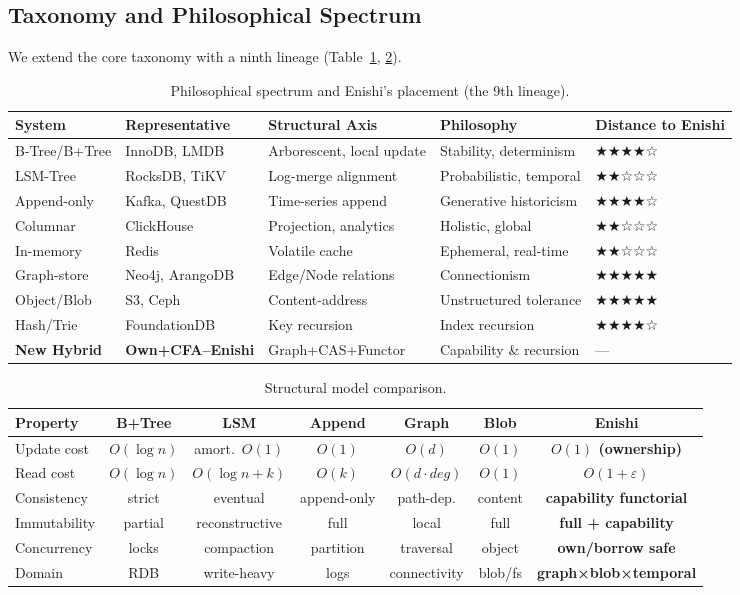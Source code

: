\documentclass[10pt]{article}
\begin{document}
\subsection{Taxonomy and Philosophical Spectrum}
We extend the core taxonomy with a ninth lineage (Table~\ref{tab:spectrum}, \ref{tab:model}).
\begin{table}[h]
\centering
\small
\begin{tabularx}{\linewidth}{l l l l l}
\toprule
System & Representative & Structural Axis & Philosophy & Distance to Enishi \\
\midrule
B-Tree/B+Tree & InnoDB, LMDB & Arborescent, local update & Stability, determinism & ★★★★☆ \\
LSM-Tree & RocksDB, TiKV & Log-merge alignment & Probabilistic, temporal & ★★☆☆☆ \\
Append-only & Kafka, QuestDB & Time-series append & Generative historicism & ★★★★☆ \\
Columnar & ClickHouse & Projection, analytics & Holistic, global & ★★☆☆☆ \\
In-memory & Redis & Volatile cache & Ephemeral, real-time & ★★☆☆☆ \\
Graph-store & Neo4j, ArangoDB & Edge/Node relations & Connectionism & ★★★★★ \\
Object/Blob & S3, Ceph & Content-address & Unstructured tolerance & ★★★★★ \\
Hash/Trie & FoundationDB & Key recursion & Index recursion & ★★★★☆ \\
\textbf{New Hybrid} & \textbf{Own+CFA--Enishi} & Graph+CAS+Functor & Capability \& recursion & --- \\
\bottomrule
\end{tabularx}
\caption{Philosophical spectrum and Enishi's placement (the 9th lineage).}
\label{tab:spectrum}
\end{table}

\begin{table}[h]
\centering
\small
\begin{tabularx}{\linewidth}{l c c c c c c}
\toprule
Property & B+Tree & LSM & Append & Graph & Blob & \textbf{Enishi} \\
\midrule
Update cost & $O(\log n)$ & amort.\ $O(1)$ & $O(1)$ & $O(d)$ & $O(1)$ & \textbf{$O(1)$ (ownership)} \\
Read cost & $O(\log n)$ & $O(\log n{+}k)$ & $O(k)$ & $O(d\cdot deg)$ & $O(1)$ & \textbf{$O(1{+}\varepsilon)$} \\
Consistency & strict & eventual & append-only & path-dep. & content & \textbf{capability functorial} \\
Immutability & partial & reconstructive & full & local & full & \textbf{full + capability} \\
Concurrency & locks & compaction & partition & traversal & object & \textbf{own/borrow safe} \\
Domain & RDB & write-heavy & logs & connectivity & blob/fs & \textbf{graph×blob×temporal} \\
\bottomrule
\end{tabularx}
\caption{Structural model comparison.}
\label{tab:model}
\end{table}
\end{document}

